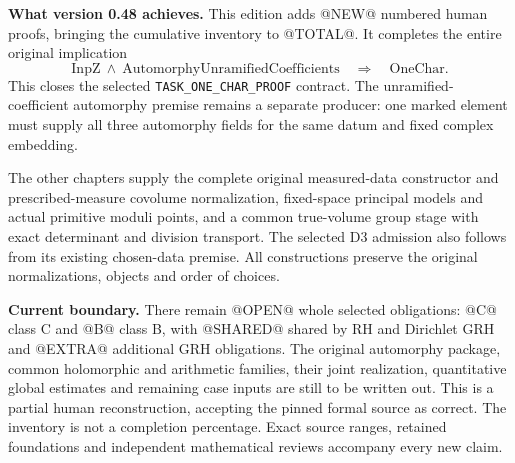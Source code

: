 \textbf{What version 0.48 achieves.}
This edition adds @NEW@ numbered human proofs, bringing the cumulative
inventory to @TOTAL@. It completes the entire original implication
\[
 \mathrm{InpZ}\ \wedge\
 \mathrm{AutomorphyUnramifiedCoefficients}
 \quad\Longrightarrow\quad \mathrm{OneChar}.
\]
This closes the selected \texttt{TASK\_ONE\_CHAR\_PROOF} contract.
The unramified-coefficient automorphy premise remains a separate
producer: one marked element must supply all three automorphy fields
for the same datum and fixed complex embedding.

The other chapters supply the complete original measured-data
constructor and prescribed-measure covolume normalization, fixed-space
principal models and actual primitive moduli points, and a common
true-volume group stage with exact determinant and division transport.
The selected D3 admission also follows from its existing chosen-data
premise. All constructions preserve the original normalizations,
objects and order of choices.

\textbf{Current boundary.}
There remain @OPEN@ whole selected obligations: @C@ class C and @B@
class B, with @SHARED@ shared by RH and Dirichlet GRH and @EXTRA@
additional GRH obligations. The original automorphy package, common
holomorphic and arithmetic families, their joint realization,
quantitative global estimates and remaining case inputs are still
to be written out. This is a partial human reconstruction, accepting
the pinned formal source as correct. The inventory is not a completion
percentage. Exact source ranges, retained foundations and independent
mathematical reviews accompany every new claim.


